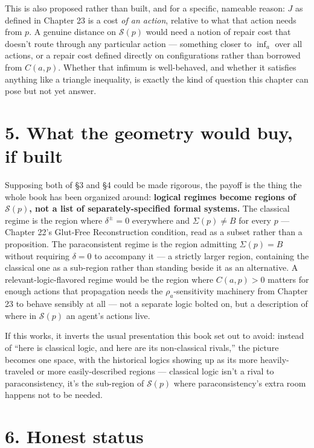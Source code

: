 This is also proposed rather than built, and for a specific, nameable
reason: \(J\) as defined in Chapter 23 is a cost \emph{of an action}, relative to
what that action needs from \(p\). A genuine distance on \(\mathcal{S}(p)\)
would need a notion of repair cost that doesn't route through any
particular action --- something closer to \(\inf_a\) over all actions, or a
repair cost defined directly on configurations rather than borrowed from
\(C(a,p)\). Whether that infimum is well-behaved, and whether it satisfies
anything like a triangle inequality, is exactly the kind of question this
chapter can pose but not yet answer.

\hypertarget{what-the-geometry-would-buy-if-built}{%
\section{5. What the geometry would buy, if built}\label{what-the-geometry-would-buy-if-built}}

Supposing both of §3 and §4 could be made rigorous, the payoff is the
thing the whole book has been organized around: \textbf{logical regimes become
regions of \(\mathcal{S}(p)\), not a list of separately-specified formal
systems.} The classical regime is the region where \(\delta^\pm = 0\)
everywhere and \(\Sigma(p) \neq B\) for every \(p\) --- Chapter 22's Glut-Free
Reconstruction condition, read as a subset rather than a proposition.
The paraconsistent regime is the region admitting \(\Sigma(p) = B\) without
requiring \(\delta = 0\) to accompany it --- a strictly larger region,
containing the classical one as a sub-region rather than standing beside
it as an alternative. A relevant-logic-flavored regime would be the
region where \(C(a,p) > 0\) matters for enough actions that propagation
needs the \(\rho_a\)-sensitivity machinery from Chapter 23 to behave
sensibly at all --- not a separate logic bolted on, but a description of
where in \(\mathcal{S}(p)\) an agent's actions live.

If this works, it inverts the usual presentation this book set out to
avoid: instead of ``here is classical logic, and here are its
non-classical rivals,'' the picture becomes one space, with the historical
logics showing up as its more heavily-traveled or more easily-described
regions --- classical logic isn't a rival to paraconsistency, it's the
sub-region of \(\mathcal{S}(p)\) where paraconsistency's extra room happens
not to be needed.

\hypertarget{honest-status}{%
\section{6. Honest status}\label{honest-status}}

